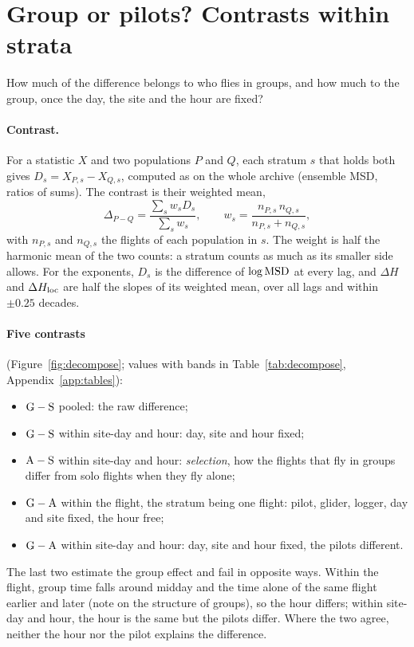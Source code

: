 \section{Group or pilots? Contrasts within strata}\label{sec:other}

How much of the difference belongs to who flies in groups, and how much to the group, once the day,
the site and the hour are fixed?

\paragraph{Contrast.} For a statistic $X$ and two populations $P$ and $Q$, each stratum $s$ that holds
both gives $D_s=X_{P,s}-X_{Q,s}$, computed as on the whole archive (ensemble MSD, ratios of sums).
The contrast is their weighted mean,
\begin{equation}\label{eq:contrast}
  \Delta_{P-Q}=\frac{\sum_s w_s D_s}{\sum_s w_s},\qquad w_s=\frac{n_{P,s}\,n_{Q,s}}{n_{P,s}+n_{Q,s}},
\end{equation}
with $n_{P,s}$ and $n_{Q,s}$ the flights of each population in $s$. The weight is half the harmonic
mean of the two counts: a stratum counts as much as its smaller side allows. For the exponents,
$D_s$ is the difference of $\log\mathrm{MSD}$ at every lag, and $\Delta H$ and $\Delta H_\mathrm{loc}$ are half the
slopes of its weighted mean, over all lags and within $\pm0.25$ decades.

\paragraph{Five contrasts} (Figure~\ref{fig:decompose}; values with bands in
Table~\ref{tab:decompose}, Appendix~\ref{app:tables}):
\begin{itemize}
  \item $\mathrm{G}-\mathrm{S}$ pooled: the raw difference;
  \item $\mathrm{G}-\mathrm{S}$ within site-day and hour: day, site and hour fixed;
  \item $\mathrm{A}-\mathrm{S}$ within site-day and hour: \emph{selection}, how the flights that fly in groups differ
        from solo flights when they fly alone;
  \item $\mathrm{G}-\mathrm{A}$ within the flight, the stratum being one flight: pilot, glider, logger, day and site
        fixed, the hour free;
  \item $\mathrm{G}-\mathrm{A}$ within site-day and hour: day, site and hour fixed, the pilots different.
\end{itemize}
The last two estimate the group effect and fail in opposite ways. Within the flight, group time falls
around midday and the time alone of the same flight earlier and later (note on the structure of groups), so the
hour differs; within site-day and hour, the hour is the same but the pilots differ. Where the two
agree, neither the hour nor the pilot explains the difference.

